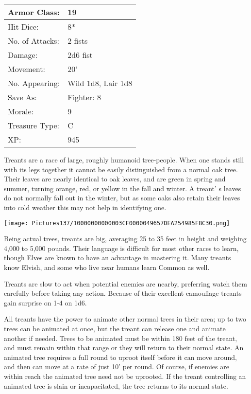 \documentclass[a4paper,twoside,openany,10pt]{book}
\begin{document}
\begin{multicols}{2}
\begin{tabularx}{0.50\textwidth}{@{}lX@{}}
Armor Class: & 19 \\\hline
Hit Dice: & 8* \\\hline
No. of Attacks: & 2 fists \\\hline
Damage: & 2d6 fist \\\hline
Movement: & 20' \\\hline
No. Appearing: & Wild 1d8, Lair 1d8 \\\hline
Save As: & Fighter: 8 \\\hline
Morale: & 9 \\\hline
Treasure Type: & C \\\hline
XP: & 945 \\\hline
\end{tabularx}\medskip

Treants are a race of large, roughly humanoid tree-people. When one stands still with its legs together it cannot be easily distinguished from a normal oak tree. Their leaves are nearly identical to oak leaves, and are green in spring and summer, turning orange, red, or yellow in the fall and winter. A treant' s leaves do not normally fall out in the winter, but as some oaks also retain their leaves into cold weather this may not help in identifying one.

\begin{center} \texttt{[image: Pictures137/10000000000003CF0000049657DEA254985FBC30.png]} \end{center}

Being actual trees, treants are big, averaging 25 to 35 feet in height and weighing 4,000 to 5,000 pounds. Their language is difficult for most other races to learn, though Elves are known to have an advantage in mastering it. Many treants know Elvish, and some who live near humans learn Common as well.

Treants are slow to act when potential enemies are nearby, preferring watch them carefully before taking any action. Because of their excellent camouflage treants gain surprise on 1-4 on 1d6.

All treants have the power to animate other normal trees in their area; up to two trees can be animated at once, but the treant can release one and animate another if needed. Trees to be animated must be within 180 feet of the treant, and must remain within that range or they will return to their normal state. An animated tree requires a full round to uproot itself before it can move around, and then can move at a rate of just 10' per round. Of course, if enemies are within reach the animated tree need not be uprooted. If the treant controlling an animated tree is slain or incapacitated, the tree returns to its normal state.


\end{multicols}
\end{document}
